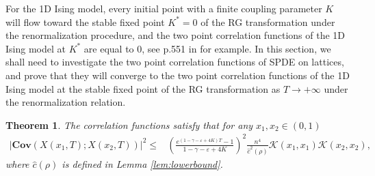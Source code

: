 \documentclass[11pt]{article}
\numberwithin{equation}{section}%
\numberwithin{figure}{section}%
\newtheorem{theorem}{Theorem}[section]
\theoremstyle{remark}
\begin{document}
	For the 1D Ising model, every initial point with a finite coupling parameter $K$ will flow toward the stable fixed point $K^{*}=0$ of the RG transformation under the renormalization procedure, and the two point correlation functions of the 1D Ising model at $K^{*}$ are equal to 0, see p.551 in \cite{Morandi2001document} for example. In this section, we shall need to investigate the two point correlation functions of SPDE on lattices, and prove that they will converge to the two point correlation functions of the 1D Ising model at the stable fixed point of the RG transformation as $T\rightarrow +\infty$ under the renormalization relation.
	\begin{theorem}\label{thm:6.3}
		The correlation functions satisfy that for any $x_{1},x_{2}\in(0,1)$
		\begin{align*}
			\vert \textbf{Cov}(X(x_{1},T);X(x_{2},T))\vert^{2}\leq & \left(\frac{e^{(1-\gamma-\varepsilon+4K)T}-1}{1-\gamma-\varepsilon+4K}\right)^{2}\frac{n^{4}}{\hat{c}^{2}(\rho)}\mathcal{K}(x_{1},x_{1})\mathcal{K}(x_{2},x_{2}),
		\end{align*}
	where $\hat{c}(\rho)$ is defined in Lemma \ref{lem:lowerbound}.
	\end{theorem}
	
\end{document}
